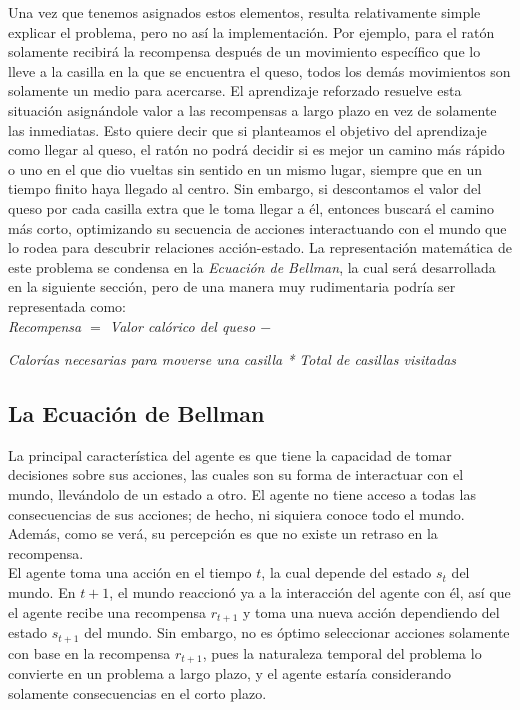 Una vez que tenemos asignados estos elementos, resulta relativamente simple explicar el problema, pero no as\'i la implementaci\'on. Por ejemplo, para el rat\'on solamente recibir\'a la recompensa despu\'es de un movimiento espec\'ifico que lo lleve a la casilla en la que se encuentra el queso, todos los dem\'as movimientos son solamente un medio para acercarse. El aprendizaje reforzado resuelve esta situaci\'on asign\'andole valor a las recompensas a largo plazo en vez de solamente las inmediatas. Esto quiere decir que si planteamos el objetivo del aprendizaje como llegar al queso, el rat\'on no podr\'a decidir si es mejor un camino m\'as r\'apido o uno en el que dio vueltas sin sentido en un mismo lugar, siempre que en un tiempo finito haya llegado al centro. Sin embargo, si descontamos el valor del queso por cada casilla extra que le toma llegar a \'el, entonces buscar\'a el camino m\'as corto, optimizando su secuencia de acciones interactuando con el mundo que lo rodea para descubrir relaciones acci\'on-estado. La representaci\'on matem\'atica de este problema se condensa en la \textit{Ecuaci\'on de Bellman}, la cual ser\'a desarrollada en la siguiente secci\'on, pero de una manera muy rudimentaria podr\'ia ser representada como:\\

\textit{Recompensa $=$ Valor cal\'orico del queso $-$}

\hspace{22mm} \textit{Calor\'ias necesarias para moverse una casilla * Total de casillas visitadas}
  
\subsection{La Ecuaci\'on de Bellman}  
    
La principal caracter\'istica del agente es que tiene la capacidad de tomar decisiones sobre sus acciones, las cuales son su forma de interactuar con el mundo, llev\'andolo de un estado a otro. El agente no tiene acceso a todas las consecuencias de sus acciones; de hecho, ni siquiera conoce todo el mundo. Adem\'as, como se ver\'a, su percepci\'on es que no existe un retraso en la recompensa.\\

El agente toma una acci\'on en el tiempo $t$, la cual depende del estado $s_t$ del mundo. En $t+1$, el mundo reaccion\'o ya a la interacci\'on del agente con \'el, as\'i que el agente recibe una recompensa $r_{t+1}$ y toma una nueva acci\'on dependiendo del estado $s_{t+1}$ del mundo. Sin embargo, no es \'optimo seleccionar acciones solamente con base en la recompensa $r_{t+1}$, pues la naturaleza temporal del problema lo convierte en un problema a largo plazo, y el agente estar\'ia considerando solamente consecuencias en el corto plazo.\\

